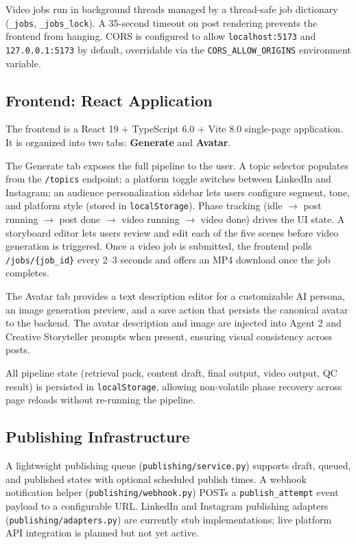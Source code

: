 \documentclass[12pt, letterpaper]{article}
\begin{document}
Video jobs run in background threads managed by a thread-safe job dictionary
(\texttt{\_jobs}, \texttt{\_jobs\_lock}). A 35-second timeout on post rendering
prevents the frontend from hanging. CORS is configured to allow \texttt{localhost:5173}
and \texttt{127.0.0.1:5173} by default, overridable via the \texttt{CORS\_ALLOW\_ORIGINS}
environment variable.

\subsection{Frontend: React Application}

The frontend is a React 19 + TypeScript 6.0 + Vite 8.0 single-page application.
It is organized into two tabs: \textbf{Generate} and \textbf{Avatar}.

The Generate tab exposes the full pipeline to the user. A topic selector populates
from the \texttt{/topics} endpoint; a platform toggle switches between LinkedIn and
Instagram; an audience personalization sidebar lets users configure segment, tone,
and platform style (stored in \texttt{localStorage}). Phase tracking (idle $\to$
post running $\to$ post done $\to$ video running $\to$ video done) drives the UI
state. A storyboard editor lets users review and edit each of the five scenes before
video generation is triggered. Once a video job is submitted, the frontend polls
\texttt{/jobs/\{job\_id\}} every 2--3 seconds and offers an MP4 download once the
job completes.

The Avatar tab provides a text description editor for a customizable AI persona, an
image generation preview, and a save action that persists the canonical avatar to the
backend. The avatar description and image are injected into Agent 2 and Creative
Storyteller prompts when present, ensuring visual consistency across posts.

All pipeline state (retrieval pack, content draft, final output, video output, QC
result) is persisted in \texttt{localStorage}, allowing non-volatile phase recovery
across page reloads without re-running the pipeline.

\subsection{Publishing Infrastructure}

A lightweight publishing queue (\texttt{publishing/service.py}) supports draft,
queued, and published states with optional scheduled publish times. A webhook
notification helper (\texttt{publishing/webhook.py}) POSTs a
\texttt{publish\_attempt} event payload to a configurable URL. LinkedIn and Instagram
publishing adapters (\texttt{publishing/adapters.py}) are currently stub
implementations; live platform API integration is planned but not yet active.
\end{document}
